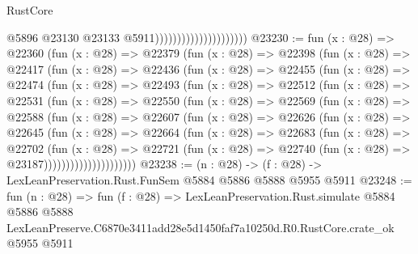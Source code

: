 \begin{lexlean}{RustCore}
\begin{coremodule}
                                              @5896
                                              @23130
                                              @23133
                                              @5911)))))))))))))))))))))
@23230 := fun (x : @28) =>
  @22360
    (fun (x : @28) =>
    @22379
      (fun (x : @28) =>
      @22398
        (fun (x : @28) =>
        @22417
          (fun (x : @28) =>
          @22436
            (fun (x : @28) =>
            @22455
              (fun (x : @28) =>
              @22474
                (fun (x : @28) =>
                @22493
                  (fun (x : @28) =>
                  @22512
                    (fun (x : @28) =>
                    @22531
                      (fun (x : @28) =>
                      @22550
                        (fun (x : @28) =>
                        @22569
                          (fun (x : @28) =>
                          @22588
                            (fun (x : @28) =>
                            @22607
                              (fun (x : @28) =>
                              @22626
                                (fun (x : @28) =>
                                @22645
                                  (fun (x : @28) =>
                                  @22664
                                    (fun (x : @28) =>
                                    @22683
                                      (fun (x : @28) =>
                                      @22702
                                        (fun (x : @28) =>
                                        @22721
                                          (fun (x : @28) =>
                                          @22740 (fun (x : @28) => @23187)))))))))))))))))))))
@23238 := (n : @28) -> (f : @28) -> LexLeanPreservation.Rust.FunSem @5884 @5886 @5888 @5955 @5911
@23248 := fun (n : @28) =>
  fun (f : @28) =>
  LexLeanPreservation.Rust.simulate
    @5884
    @5886
    @5888
    LexLeanPreserve.C6870e3411add28e5d1450faf7a10250d.R0.RustCore.crate_ok
    @5955
    @5911
\end{coremodule}
\end{lexlean}
